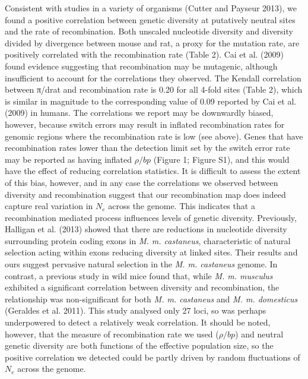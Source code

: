 	Consistent with studies in a variety of organisms (Cutter and Payseur 2013), we found a positive correlation between genetic diversity at putatively neutral sites and the rate of recombination. Both unscaled nucleotide diversity and diversity divided by divergence between mouse and rat, a proxy for the mutation rate, are positively correlated with the recombination rate (Table 2). Cai et al. (2009) found evidence suggesting that recombination may be mutagenic, although insufficient to account for the correlations they observed. The Kendall correlation between π/drat and recombination rate is 0.20 for all 4-fold sites (Table 2), which is similar in magnitude to the corresponding value of 0.09 reported by Cai et al. (2009) in humans. The correlations we report may be downwardly biased, however, because switch errors may result in inflated recombination rates for genomic regions where the recombination rate is low (see above). Genes that have recombination rates lower than the detection limit set by the switch error rate may be reported as having inflated $\rho /bp$ (Figure 1; Figure S1), and this would have the effect of reducing correlation statistics. It is difficult to assess the extent of this bias, however, and in any case the correlations we observed between diversity and recombination suggest that our recombination map does indeed capture real variation in $N_e$ across the genome. This indicates that a recombination mediated process influences levels of genetic diversity. Previously, Halligan et al. (2013) showed that there are reductions in nucleotide diversity surrounding protein coding exons in \textit{M. m. castaneus}, characteristic of natural selection acting within exons reducing diversity at linked sites. Their results and ours suggest pervasive natural selection in the \textit{M. m. castaneus} genome. In contrast, a previous study in wild mice found that, while \textit{M. m. musculus} exhibited a significant correlation between diversity and recombination, the relationship was non-significant for both \textit{M. m. castaneus} and \textit{M. m. domesticus} (Geraldes et al. 2011). This study analysed only 27 loci, so was perhaps underpowered to detect a relatively weak correlation. It should be noted, however, that the measure of recombination rate we used ($\rho /bp$) and neutral genetic diversity are both functions of the effective population size, so the positive correlation we detected could be partly driven by random fluctuations of $N_e$ across the genome.

